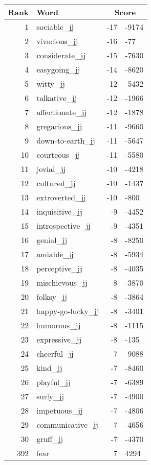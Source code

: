 \begin{longtable}[!htbp]{| rlr@{.}l |}
    \hline
    \textbf{Rank} & \textbf{Word} & \multicolumn{2}{c|}{\textbf{Score}} \\
    \hline
    \endhead
    1 & sociable\_jj & -17 & -9174 \\
    2 & vivacious\_jj & -16 & -77 \\
    3 & considerate\_jj & -15 & -7630 \\
    4 & easygoing\_jj & -14 & -8620 \\
    5 & witty\_jj & -12 & -5432 \\
    6 & talkative\_jj & -12 & -1966 \\
    7 & affectionate\_jj & -12 & -1878 \\
    8 & gregarious\_jj & -11 & -9660 \\
    9 & down-to-earth\_jj & -11 & -5647 \\
    10 & courteous\_jj & -11 & -5580 \\
    11 & jovial\_jj & -10 & -4218 \\
    12 & cultured\_jj & -10 & -1437 \\
    13 & extroverted\_jj & -10 & -800 \\
    14 & inquisitive\_jj & -9 & -4452 \\
    15 & introspective\_jj & -9 & -4351 \\
    16 & genial\_jj & -8 & -8250 \\
    17 & amiable\_jj & -8 & -5934 \\
    18 & perceptive\_jj & -8 & -4035 \\
    19 & mischievous\_jj & -8 & -3870 \\
    20 & folksy\_jj & -8 & -3864 \\
    21 & happy-go-lucky\_jj & -8 & -3401 \\
    22 & humorous\_jj & -8 & -1115 \\
    23 & expressive\_jj & -8 & -135 \\
    24 & cheerful\_jj & -7 & -9088 \\
    25 & kind\_jj & -7 & -8460 \\
    26 & playful\_jj & -7 & -6389 \\
    27 & surly\_jj & -7 & -4900 \\
    28 & impetuous\_jj & -7 & -4806 \\
    29 & communicative\_jj & -7 & -4656 \\
    30 & gruff\_jj & -7 & -4370 \\
    392 & fear & 7 & 4294 \\

\end{longtable}
